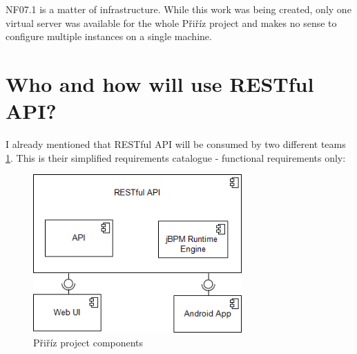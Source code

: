 	NF07.1 is a matter of infrastructure. While this work was being created, only one virtual server was available for the
	whole Přiříz project and makes no sense to configure multiple instances on a single machine.
	
	\section{Who and how will use RESTful API?}\label{sec:who_will_use}
	
	I already mentioned that RESTful API will be consumed by two different teams \ref{fig:pririz_project_component}. This
	is their simplified requirements catalogue - functional requirements only:
	
	\begin{figure}[h]
	  	\centering
	  	\label{fig:pririz_project_component}
	    \includegraphics[width=8cm]{figures/pririz_project_component}
	  	\caption{Přiříz project components}
	\end{figure} 
	
